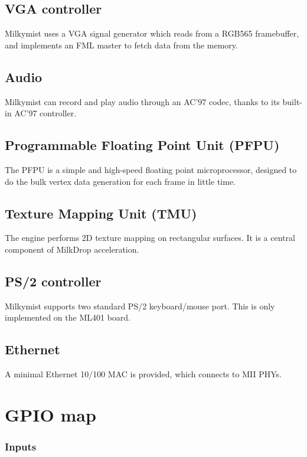\documentclass[a4paper,11pt]{article}
\begin{document}
\subsection{VGA controller}
Milkymist uses a VGA signal generator which reads from a RGB565 framebuffer, and implements an FML master to fetch data from the memory.

\subsection{Audio}
Milkymist can record and play audio through an AC'97 codec, thanks to its built-in AC'97 controller.

\subsection{Programmable Floating Point Unit (PFPU)}
The PFPU is a simple and high-speed floating point microprocessor, designed to do the bulk vertex data generation for each frame in little time.

\subsection{Texture Mapping Unit (TMU)}
The engine performs 2D texture mapping on rectangular surfaces. It is a central component of MilkDrop acceleration.

\subsection{PS/2 controller}
Milkymist supports two standard PS/2 keyboard/mouse port. This is only implemented on the ML401 board.

\subsection{Ethernet}
A minimal Ethernet 10/100 MAC is provided, which connects to MII PHYs.

\section{GPIO map}

\subsubsection{Inputs}
\end{document}
